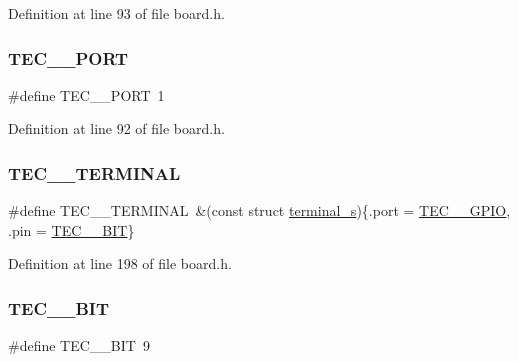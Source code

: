 Definition at line 93 of file board.\+h.

\mbox{\label{group__hal_ga6dd94a0728943a6bb0706bae78aa529f}} 
\subsubsection{\texorpdfstring{T\+E\+C\+\_\+\_\+\+P\+O\+RT}{TEC\_2\_PORT}}
{\footnotesize\ttfamily \#define T\+E\+C\+\_\+\_\+\+P\+O\+RT~1}



Definition at line 92 of file board.\+h.

\mbox{\label{group__hal_gaf57c15d1a0c66122305352e3637026c2}} 
\subsubsection{\texorpdfstring{T\+E\+C\+\_\+\_\+\+T\+E\+R\+M\+I\+N\+AL}{TEC\_2\_TERMINAL}}
{\footnotesize\ttfamily \#define T\+E\+C\+\_\+\_\+\+T\+E\+R\+M\+I\+N\+AL~\&(const struct \hyperlink{structterminal__s}{terminal\+\_\+s})\{.port = \hyperlink{group__samples_ga83ce1f0ab51ee7b4df55e629cdfc52d9}{T\+E\+C\+\_\+\_\+\+G\+P\+IO}, .pin = \hyperlink{group__samples_gaed7549a304721e36693036c8a289ff4c}{T\+E\+C\+\_\+\_\+\+B\+IT}\}}



Definition at line 198 of file board.\+h.

\mbox{\label{group__hal_ga64392cf03fba776f8a9dc238e25ec184}} 
\subsubsection{\texorpdfstring{T\+E\+C\+\_\+\_\+\+B\+IT}{TEC\_3\_BIT}}
{\footnotesize\ttfamily \#define T\+E\+C\+\_\+\_\+\+B\+IT~9}



